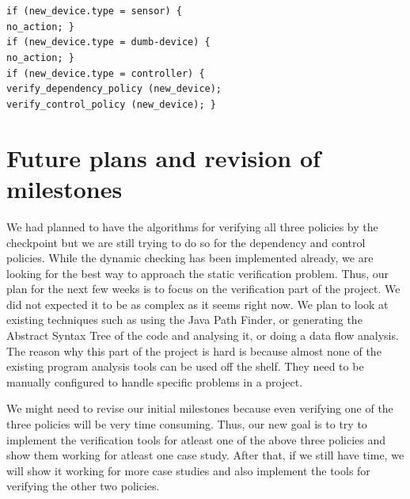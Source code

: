 \documentclass{article}
\begin{document}
\noindent \texttt{if (new\_device.type = sensor) \{ \\ \hspace*{1cm} no\_action; \} \\
if (new\_device.type = dumb-device) \{ \\ \hspace*{1cm} no\_action; \} \\
if (new\_device.type = controller) \{ \\ \hspace*{1cm} verify\_dependency\_policy (new\_device); \\ \hspace*{1.0cm} verify\_control\_policy (new\_device); \}}\\ 

\section{Future plans and revision of milestones}
We had planned to have the algorithms for verifying all three policies by the checkpoint but we are still trying to do so for the dependency and control policies. While the dynamic checking has been implemented already, we are looking for the best way to approach the static verification problem. Thus, our plan for the next few weeks is to focus on the verification part of the project. We did not expected it to be as complex as it seems right now. We plan to look at existing techniques such as using the Java Path Finder, or generating the Abstract Syntax Tree of the code and analysing it, or doing a data flow analysis. The reason why this part of the project is hard is because almost none of the existing program analysis tools can be used off the shelf. They need to be manually configured to handle specific problems in a project. 

We might need to revise our initial milestones because even verifying one of the three policies will be very time consuming.  Thus, our new goal is to try to implement the verification tools for atleast one of the above three policies and show them working for atleast one case study. After that, if we still have time, we will show it working for more case studies and also implement the tools for verifying the other two policies.
\end{document}
